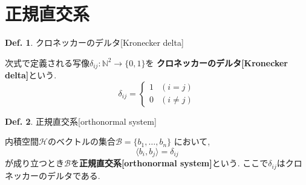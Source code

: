 \documentclass[a4paper,10pt,report]{amsart}
\theoremstyle{plain}
\theoremstyle{definition}
\newtheorem{defn}{Def.}[section]
\theoremstyle{remark}
\begin{document}
\section{正規直交系}
\begin{leftbar}
    \begin{defn}クロネッカーのデルタ[Kronecker delta]\par
        次式で定義される写像\(\delta_{ij}:{\mathbb{N}}^{2}\to{}\{0,1\} \)を
        \textbf{クロネッカーのデルタ[Kronecker delta]}という. 
        \begin{equation}
            \delta_{ij}=
            \begin{cases}
                1&(i=j)\\
                0&(i\neq j)
            \end{cases}
        \end{equation}
    \end{defn}
\end{leftbar}
\begin{leftbar}
    \begin{defn}正規直交系[orthonormal system]\par
        内積空間\(\mathcal{H}\)のベクトルの集合\(\mathcal{B}=\{b_{1},\dots,b_{n}\} \)
        において,
        \begin{equation}
            \langle b_{i},b_{j}\rangle=\delta_{ij}
        \end{equation}
        が成り立つとき\(\mathcal{B}\)を\textbf{正規直交系[orthonormal system]}という. 
        ここで\(\delta_{ij}\)はクロネッカーのデルタである. 
    \end{defn}
\end{leftbar}
\end{document}

